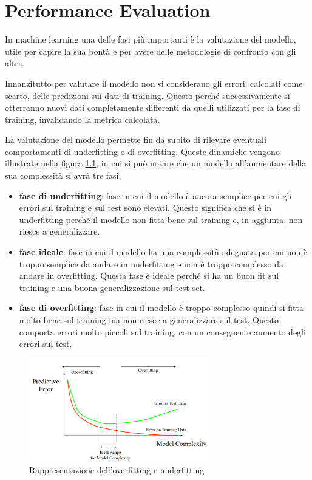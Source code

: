\chapter{Performance Evaluation}
In machine learning una delle fasi più importanti è la valutazione del modello,
utile per capire la sua bontà e per avere delle metodologie di confronto con gli
altri.

Innanzitutto per valutare il modello non si considerano gli errori, calcolati
come scarto, delle predizioni sui dati di training. Questo perché successivamente
si otterranno nuovi dati completamente differenti da quelli utilizzati per la fase
di training, invalidando la metrica calcolata.

La valutazione del modello permette fin da subito di rilevare eventuali
comportamenti di underfitting o di overfitting. Queste dinamiche vengono illustrate
nella figura \ref{fig:overfitting-vs-underfitting}, in cui si può notare che un
modello all'aumentare della sua complessità si avrà tre fasi:
\begin{itemize}
    \item \textbf{fase di underfitting}: fase in cui il modello è ancora semplice
          per cui gli errori sul training e sul test sono elevati. Questo significa
          che si è in underfitting perché il modello non fitta bene sul training
          e, in aggiunta, non riesce a generalizzare.
    \item \textbf{fase ideale}: fase in cui il modello ha una complessità adeguata
          per cui non è troppo semplice da andare in underfitting e non è troppo
          complesso da andare in overfitting. Questa fase è ideale perché si ha
          un buon fit sul training e una buona generalizzazione sul test set.
    \item \textbf{fase di overfitting}: fase in cui il modello è troppo complesso
          quindi si fitta molto bene sul training ma non riesce a generalizzare
          sul test. Questo comporta errori molto piccoli sul training, con un
          conseguente aumento degli errori sul test.
\end{itemize}
\begin{figure}[!ht]
    \centering
    \includegraphics[width=0.7\textwidth]{img/performance evaluation/overfitting_vs_underfitting.png}
    \caption{Rappresentazione dell'overfitting e underfitting}
    \label{fig:overfitting-vs-underfitting}
\end{figure}
